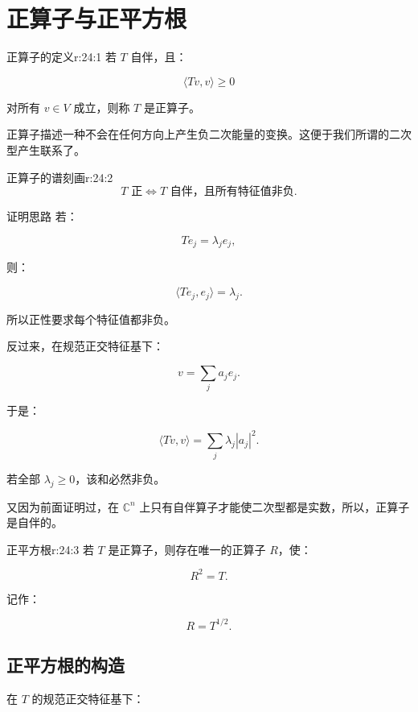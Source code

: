 
\chapter{正算子与正平方根}


\begin{jdefn}{正算子的定义}{r:24:1}
若 $T$ 自伴，且：

\[
\langle Tv,v\rangle\ge0
\]

对所有 $v\in V$ 成立，则称 $T$ 是正算子。

正算子描述一种不会在任何方向上产生负二次能量的变换。这便于我们所谓的二次型产生联系了。
\end{jdefn}

\begin{jprop}{正算子的谱刻画}{r:24:2}
\[
T\text{ 正}
\iff
T\text{ 自伴，且所有特征值非负}.
\]
\end{jprop}

\begin{jproof}{证明思路}
若：

\[
Te_j=\lambda_je_j,
\]

则：

\[
\langle Te_j,e_j\rangle
=
\lambda_j.
\]

所以正性要求每个特征值都非负。

反过来，在规范正交特征基下：

\[
v=\sum_j a_je_j.
\]

于是：

\[
\langle Tv,v\rangle
=
\sum_j\lambda_j|a_j|^2.
\]

若全部 $\lambda_j\ge0$，该和必然非负。

又因为前面证明过，在 $\mathbb C^n$ 上只有自伴算子才能使二次型都是实数，所以，正算子是自伴的。
\end{jproof}

\begin{jthm}{正平方根}{r:24:3}
若 $T$ 是正算子，则存在唯一的正算子 $R$，使：

\[
R^2=T.
\]

记作：

\[
R=T^{1/2}.
\]
\end{jthm}

\section{正平方根的构造}

在 $T$ 的规范正交特征基下：

